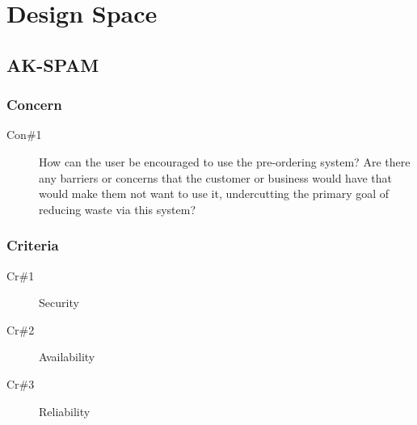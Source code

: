 \documentclass[11pt]{article}
\begin{document}
\newpage
\section{Design Space}
\label{sec:org5de5213}
\subsection*{AK-SPAM}
\label{sec:org4ba96cd}
\subsubsection*{Concern}
\label{sec:orgc9636cd}
\begin{description}
\item[{Con\#1}] How can the user be encouraged to use the pre-ordering
system? Are there any barriers or concerns that the
customer or business would have that would make them
not want to use it, undercutting the primary goal of
reducing waste via this system?
\end{description}
\subsubsection*{Criteria}
\label{sec:org92e680a}
\begin{description}
\item[{Cr\#1}] Security
\item[{Cr\#2}] Availability
\item[{Cr\#3}] Reliability
\end{description}
\end{document}
